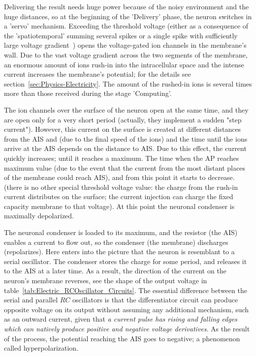 Delivering the result needs huge power because of the noisy environment and 
the huge distances, so at the beginning of the 'Delivery' phase,
the neuron switches in a 'servo' mechanism. Exceeding the threshold voltage
(either as a consequence of the 'spatiotemporal' summing several spikes or a single spike with sufficiently large voltage gradient~\cite{LosonczyIntegrative:2006}) opens the voltage-gated ion channels in the membrane's wall. 
Due to the
vast voltage gradient across the two segments of the membrane, an enormous 
amount of ions rush-in into the intracellular space and the intense current
increases the membrane's potential; for the details see section~\ref{sec:Physics-Electricity}. The amount of the rushed-in ions
is several times more than those received during the stage 'Computing'.

The ion channels over the surface of the neuron open
at the same time, and they are open only for a very short period
(actually, they implement a sudden "step current"). However, this 
current on the surface is created at different distances from the \gls{AIS}
and (due to the final speed of the ions) and the time until the ions 
arrive at the \gls{AIS} depends on the distance to \gls{AIS}.
Due to this effect, the current quickly increases;
until it reaches a maximum. 
The time when the \gls{AP} reaches maximum value (due to the event that
the current from the most distant places of the membrane could reach \gls{AIS}), 
and from this point it starts to decrease.
(there is no other special threshold voltage value:
the charge from the rush-in current distributes on the surface;
the current injection can charge the fixed capacity 
membrane to that voltage).
At this point the neuronal condenser is maximally depolarized.

The neuronal condenser is loaded to its maximum, and the resistor (the \gls{AIS})
enables a current to flow out, so the condenser (the membrane) discharges (repolarizes).
Here enters into the picture that the neuron is resemblant to a serial oscillator.
The condenser stores the charge for some period, and releases it to the \gls{AIS}
at a later time. As a result, the direction of the current on the neuron's
membrane reverses, see the shape of the output voltage in table~\ref{tab:Electric_RCOscillator_Circuits}.
The essential difference between the serial and parallel $RC$ oscillators is
that the differentiator circuit can produce opposite voltage on its output
without assuming any additional mechanism, such as an outward current,
given that \textit{a current pulse has rising and falling edges which can natively produce 
positive and negative voltage derivatives}.
As the result of the process, the potential reaching the AIS goes to negative;
a phenomenon called hyperpolarization.

